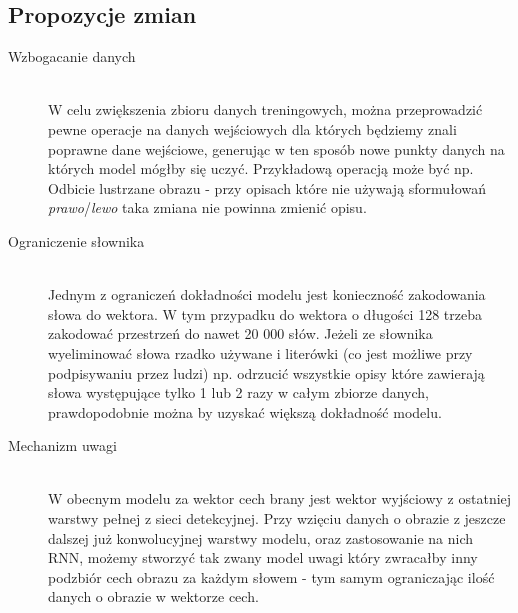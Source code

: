 \subsection*{Propozycje zmian}
\begin{description}
	\item[Wzbogacanie danych] \hfill \\
	W celu zwiększenia zbioru danych treningowych, można przeprowadzić pewne operacje na danych wejściowych dla których będziemy znali poprawne dane wejściowe, generując w ten sposób nowe punkty danych na których model mógłby się uczyć. Przykładową operacją może być np. Odbicie lustrzane obrazu - przy opisach które nie używają sformułowań \textit{prawo}/\textit{lewo} taka zmiana nie powinna zmienić opisu.
	\item[Ograniczenie słownika] \hfill \\
	Jednym z ograniczeń dokładności modelu jest konieczność zakodowania słowa do wektora. W tym przypadku do wektora o długości 128 trzeba zakodować przestrzeń do nawet 20 000 słów. Jeżeli ze słownika wyeliminować słowa rzadko używane i literówki (co jest możliwe przy podpisywaniu przez ludzi) np. odrzucić wszystkie opisy które zawierają słowa występujące tylko 1 lub 2 razy w całym zbiorze danych, prawdopodobnie można by uzyskać większą dokładność modelu.
	\item[Mechanizm uwagi] \hfill \\
	W obecnym modelu za wektor cech brany jest wektor wyjściowy z ostatniej warstwy pełnej z sieci detekcyjnej. Przy wzięciu danych o obrazie z jeszcze dalszej już konwolucyjnej warstwy modelu, oraz zastosowanie na nich RNN, możemy stworzyć tak zwany model uwagi który zwracałby inny podzbiór cech obrazu za każdym słowem - tym samym ograniczając ilość  danych o obrazie w wektorze cech.
\end{description}
\newpage

